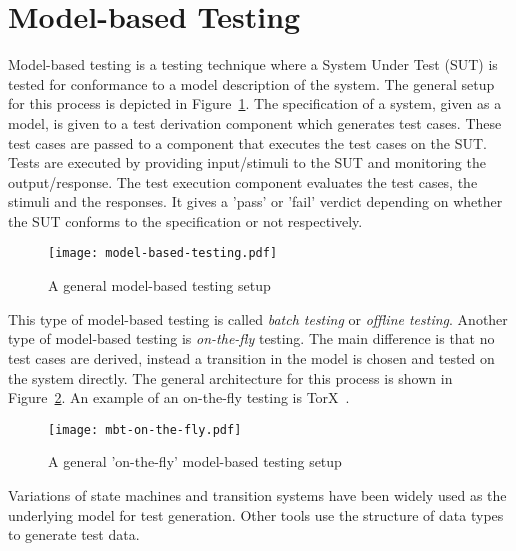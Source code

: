 \section{Model-based Testing}\label{sec:model_based_testing}

Model-based testing is a testing technique where a System Under Test (SUT) is tested for conformance to a model description of the system. The general setup for this process is depicted in Figure~\ref{fig:model_based_testing}. The specification of a system, given as a model, is given to a test derivation component which generates test cases. These test cases are passed to a component that executes the test cases on the SUT. Tests are executed by providing input/stimuli to the SUT and monitoring the output/response. The test execution component evaluates the test cases, the stimuli and the responses. It gives a 'pass' or 'fail' verdict depending on whether the SUT conforms to the specification or not respectively.

\begin{figure}[ht]
  \begin{center}
    \texttt{[image: model-based-testing.pdf]}
  \end{center}
  \caption{A general model-based testing setup}
  \label{fig:model_based_testing}
\end{figure}

This type of model-based testing is called \textit{batch testing} or \textit{offline testing}. Another type of model-based testing is \textit{on-the-fly} testing. The main difference is that no test cases are derived, instead a transition in the model is chosen and tested on the system directly. The general architecture for this process is shown in Figure~\ref{fig:model_based_testing_on_the_fly}. An example of an on-the-fly testing is TorX~\cite{Tretmans:TorX}.

\begin{figure}[ht]
  \begin{center}
    \texttt{[image: mbt-on-the-fly.pdf]}
  \end{center}
  \caption{A general 'on-the-fly' model-based testing setup}
  \label{fig:model_based_testing_on_the_fly}
\end{figure}

Variations of state machines and transition systems have been widely used as the underlying model for test generation. Other tools use the structure of data types to generate test data. 

